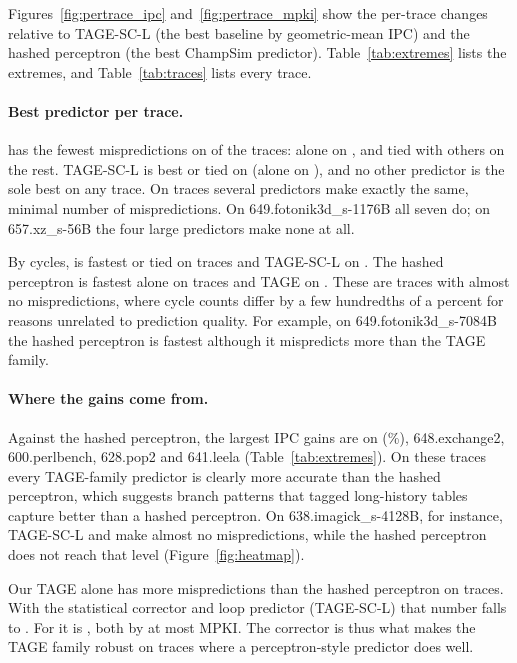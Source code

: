 Figures~\ref{fig:pertrace_ipc} and~\ref{fig:pertrace_mpki} show the per-trace changes relative to TAGE-SC-L (the best baseline by geometric-mean IPC) and the hashed perceptron (the best ChampSim predictor). Table~\ref{tab:extremes} lists the extremes, and Table~\ref{tab:traces} lists every trace.

\paragraph{Best predictor per trace.} \prop{} has the fewest mispredictions on  of the  traces: alone on , and tied with others on the rest. TAGE-SC-L is best or tied on  (alone on ), and no other predictor is the sole best on any trace. On  traces several predictors make exactly the same, minimal number of mispredictions. On 649.fotonik3d\_s-1176B all seven do; on 657.xz\_s-56B the four large predictors make none at all.

By cycles, \prop{} is fastest or tied on  traces and TAGE-SC-L on . The hashed perceptron is fastest alone on  traces and TAGE on . These are traces with almost no mispredictions, where cycle counts differ by a few hundredths of a percent for reasons unrelated to prediction quality. For example, on 649.fotonik3d\_s-7084B the hashed perceptron is fastest although it mispredicts more than the TAGE family.

\paragraph{Where the gains come from.} Against the hashed perceptron, the largest IPC gains are on  (\%), 648.exchange2, 600.perlbench, 628.pop2 and 641.leela (Table~\ref{tab:extremes}). On these traces every TAGE-family predictor is clearly more accurate than the hashed perceptron, which suggests branch patterns that tagged long-history tables capture better than a hashed perceptron. On 638.imagick\_s-4128B, for instance, TAGE-SC-L and \prop{} make almost no mispredictions, while the hashed perceptron does not reach that level (Figure~\ref{fig:heatmap}).

Our TAGE alone has more mispredictions than the hashed perceptron on  traces. With the statistical corrector and loop predictor (TAGE-SC-L) that number falls to . For \prop{} it is , both by at most  MPKI. The corrector is thus what makes the TAGE family robust on traces where a perceptron-style predictor does well.

